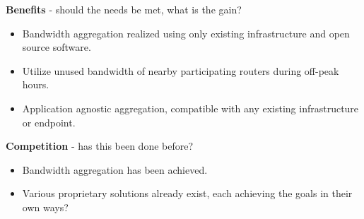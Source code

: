 \documentclass{article}
\begin{document}
	{\bf Benefits} - should the needs be met, what is the gain?\\
		\begin{itemize}
			\item Bandwidth aggregation realized using only existing infrastructure and open source software.
			\item Utilize unused bandwidth of nearby participating routers during off-peak hours.
			\item Application agnostic aggregation, compatible with any existing infrastructure or endpoint.
		\end{itemize}
	{\bf Competition} - has this been done before?\\
		\begin{itemize}
			\item Bandwidth aggregation has been achieved.
			\item Various proprietary solutions already exist, each achieving the goals in their own ways?
		\end{itemize}
\end{document}
